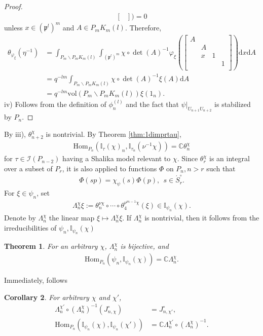 \documentclass[11pt]{amsart}
\newcommand\Lam{\Lambda}
\newcommand\vp{\varphi}%
\newcommand\p{{\mathfrak{p}}}
\newcommand\dr{\mathrm{d}}
\newcommand\C{{\mathbb{C}}}%
\newcommand\Ib{{\mathbb{I}}}
\newcommand\1{\mathbf{1}}
\newcommand\nid{\noindent}
\newcommand\ac{\acute}
\newcommand\bs{\backslash}%
\newcommand\Hom{{\mathrm{Hom}}}%
\newcommand\vol{{\mathrm{vol}}}
\newcommand\Ir{{\mathscr{I}}}
\numberwithin{equation}{section}
\newtheorem{thm}{Theorem}[section]
\newtheorem{Cor}[thm]{Corollary}
\begin{document}
\begin{proof}
\begin{align*}
\begin{bmatrix}
\end{bmatrix}) = 0
\end{align*} 
unless $x \in (\p^l)^m$ and $A \in P_m K_m(l)$. 
Therefore, 
\begin{align*}
\theta_{\vp_\xi}(\eta^{-1}) &= \int_{P_m \bs P_m K_m(l)} \int_{(\p^l)^m}  \chi \circ \det(A)^{-1} \vp_\xi(\begin{bmatrix}
A & & &  \\
&A &  & \\
& x & 1 &  \\
& & &1  \\
\end{bmatrix}) \dr x \dr A \\
&= q^{-lm} \int_{P_m \bs P_m K_m(l)}  \chi \circ \det(A)^{-1} \xi(A) \dr A \\
&= q^{-lm} \vol(P_m \bs P_m K_m(l)) \xi(1_n). 
\end{align*} 
iv) Follows from the definition of $\phi_n^{(l)}$ and the fact that $\psi|_{U_{n+1}U_{n+2}}$ is stabilized by $P_n$.
\end{proof}
\nid 
By iii), $\theta_{n+2}^\chi$ is nontrivial.
By Theorem \ref{thm:1dimprtau}, 
\begin{align}
\Hom_{P_n}(\Ib_\tau(\chi)_n, \Ib_{\tau_n}(\nu^{-1}\chi)) = \C \theta_n^\chi \label{eq:thnchi}
\end{align} 
for $\tau \in \Ir(P_{n-2})$ having a Shalika model relevant to $\chi$.
Since $\theta_r^\chi$ is an integral over a subset of $P_r$, it is also applied to functions $\Phi$ on $P_n, n > r$ such that 
\begin{align*}
\Phi(s p) = \chi_\psi(s) \Phi(p), \ \ s \in \ac{S}_r^\circ.
\end{align*}   
For $\xi \in \psi_n$, set   
\begin{align*}
\Lam_n^\chi \xi := \theta_{n}^{\nu \chi} \circ \cdots \circ \theta_4^{\nu^{m-1} \chi}( \xi) \in \Ib_{\psi_n}(\chi).
\end{align*} 
Denote by $\Lam_n^\chi$ the linear map $\xi \mapsto \Lam_n^\chi \xi$.
If $\Lam_n^\chi$ is nontrivial, then it follows from the irreducibilities of $\psi_n, \Ib_{\psi_n}(\chi)$ 
\begin{thm}\label{thm:PreSLam}
For an arbitrary $\chi$, $\Lam_n^\chi$ is bijective, and 
\begin{align*}
\Hom_{P_n}(\psi_n, \Ib_{\psi_n}(\chi)) = \C \Lam_n^\chi.
\end{align*}
\end{thm}
\nid 
Immediately, follows 
\begin{Cor}\label{Cor:PreSLam}
For arbitrary $\chi$ and $\chi'$, 
\begin{align*}
\Lam_n^{\chi'} \circ (\Lam_n^\chi)^{-1}(J_{n,\chi}^\circ) &= J_{n,\chi'}^\circ, \\ 
\Hom_{P_n}( \Ib_{\psi_n}(\chi), \Ib_{\psi_n}(\chi')) &= \C \Lam_n^{\chi'} \circ (\Lam_n^\chi)^{-1}.
\end{align*}
\end{Cor}
\end{document}
